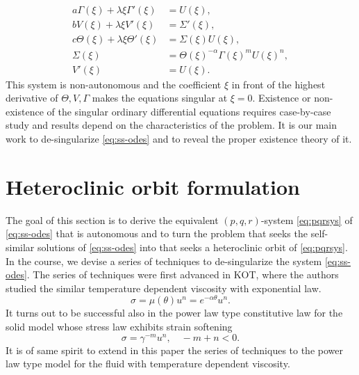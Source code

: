 \documentclass[a4paper,11pt]{article}
\begin{document}
\begin{equation}
\begin{aligned}
 a \Gamma(\xi) + \lambda \xi \Gamma'(\xi) &= U(\xi),\\
 b V(\xi) + \lambda \xi V'(\xi) &= \Sigma'(\xi),\\
 c \Theta(\xi) + \lambda \xi \Theta'(\xi)&=\Sigma(\xi) U(\xi),\\
 \Sigma(\xi) &= \Theta(\xi)^{-\alpha} \Gamma(\xi)^m U(\xi)^n,\\
 V'(\xi)&=U(\xi).
\end{aligned} \label{eq:ss-odes}
\end{equation}
This system is non-autonomous and the coefficient $\xi$ in front of the highest derivative of $\Theta, V, \Gamma$ makes the equations singular at $\xi=0$. Existence or non-existence of the singular ordinary differential equations requires case-by-case study and results depend on the characteristics of the problem. It is our main work to de-singularize \eqref{eq:ss-odes} and to reveal the proper existence theory of it. 

\section{Heteroclinic orbit formulation}
The goal of this section is to derive the equivalent $(p,q,r)$-system \eqref{eq:pqrsys} of \eqref{eq:ss-odes} that is autonomous and to turn the problem that seeks the self-similar solutions of \eqref{eq:ss-odes} into that seeks a heteroclinic orbit of \eqref{eq:pqrsys}. In the course, we devise a series of techniques to de-singularize the system \eqref{eq:ss-odes}. The series of techniques were first advanced in KOT, where the authors studied the similar temperature dependent viscosity with exponential law. 
$$ \sigma = \mu(\theta)u^n = e^{-\alpha\theta} u^n.$$ 
It turns out to be successful also in the power law type constitutive law for the solid model whose stress law exhibits strain softening
$$ \sigma = \gamma^{-m}u^n, \quad -m+n<0.$$
It is of same spirit to extend in this paper the series of techniques to the power law type model for the fluid with temperature dependent viscosity.
\end{document}
